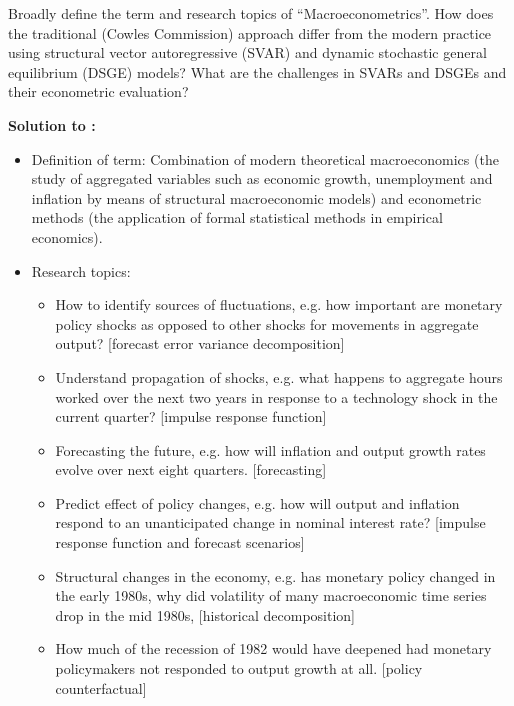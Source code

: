 Broadly define the term and research topics of \enquote{Macroeconometrics}. How does the traditional (Cowles Commission) approach differ from the modern practice using structural vector autoregressive (SVAR) and dynamic stochastic general equilibrium (DSGE) models? What are the challenges in SVARs and DSGEs and their econometric evaluation?
\begin{solution}\textbf{Solution to :}
    \begin{itemize}
        \item Definition of term: Combination of modern theoretical macroeconomics (the study of aggregated variables such as economic growth, unemployment and inflation by means of structural macroeconomic models) and econometric methods (the application of formal statistical methods in empirical economics).

        \item Research topics:
              \begin{itemize}
                  \item How to identify sources of fluctuations, e.g. how important are monetary policy shocks as opposed to other shocks for movements in aggregate output? [forecast error variance decomposition]

                  \item Understand propagation of shocks, e.g. what happens to aggregate hours worked over the next two years in response to a technology shock in the current quarter? [impulse response function]

                  \item Forecasting the future, e.g. how will inflation and output growth rates evolve over next eight quarters. [forecasting]

                  \item Predict effect of policy changes, e.g. how will output and inflation respond to an unanticipated change in nominal interest rate? [impulse response function and forecast scenarios]

                  \item Structural changes in the economy, e.g. has monetary policy changed in the early 1980s, why did volatility of many macroeconomic time series drop in the mid 1980s, [historical decomposition]

                  \item How much of the recession of 1982  would have deepened had monetary policymakers not responded to output growth at all. [policy counterfactual]
              \end{itemize}


\end{itemize}
\end{solution}
